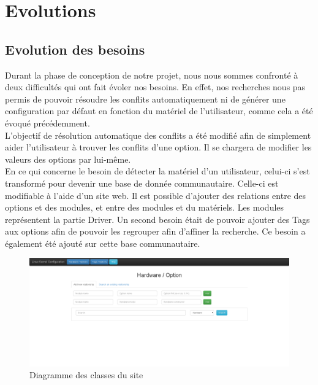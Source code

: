 \documentclass[16pts]{report}
\begin{document}

\nocite{*}

\chapter{Evolutions}
\label{cha:Evolutions}

\section{Evolution des besoins}
\label{sec:Evolution des besoins}

Durant la phase de conception de notre projet, nous nous sommes confronté à 
deux difficultés qui ont fait évoler nos besoins. En effet, nos recherches 
nous pas permis de pouvoir résoudre les conflits automatiquement ni de générer 
une configuration par défaut en fonction du matériel de l'utilisateur, comme
cela a été évoqué précédemment. 
\\
L'objectif de résolution automatique des conflits a été modifié afin de 
simplement aider l'utilisateur à trouver les conflits d'une option. Il se 
chargera de modifier les valeurs des options par lui-même.
\\
En ce qui concerne le besoin de détecter la matériel d'un utilisateur, celui-ci 
s'est transformé pour devenir une base de donnée communautaire. Celle-ci est 
modifiable à l'aide d'un site web. Il est possible d'ajouter des relations 
entre des options et des modules, et entre des modules et du matériels. Les 
modules représentent la partie Driver. Un second besoin était de pouvoir 
ajouter des Tags aux options afin de pouvoir les regrouper afin d'affiner la 
recherche. Ce besoin a également été ajouté sur cette base communautaire.

\begin{figure}[H]
	\includegraphics[scale=0.3]{../illustrations/screen_site_hardware.png}
	\centering
	\caption{Diagramme des classes du site}
	\label{fig:DiagSite}
\end{figure}
\end{document}
